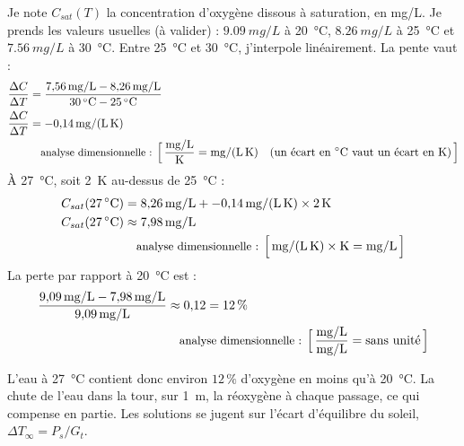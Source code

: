 \begin{demonstration}
Je note $C_{sat}(T)$ la concentration d'oxygène dissous à saturation, en mg/L. Je prends les valeurs usuelles (à valider) : $\qty{9,09}{mg/L}$ à \qty{20}{\celsius}, $\qty{8,26}{mg/L}$ à \qty{25}{\celsius} et $\qty{7,56}{mg/L}$ à \qty{30}{\celsius}. Entre \qty{25}{\celsius} et \qty{30}{\celsius}, j'interpole linéairement. La pente vaut :
\begin{align*}
\frac{\Delta C}{\Delta T} &= \frac{\qty{7,56}{mg/L} - \qty{8,26}{mg/L}}{\qty{30}{\celsius} - \qty{25}{\celsius}}\\
\frac{\Delta C}{\Delta T} &= \qty{-0,14}{mg/(L\,K)}\\
\dimline{\dfrac{\unit{mg/L}}{\unit{K}}=\unit{mg/(L\,K)}\quad(\text{un écart en \unit{\celsius} vaut un écart en \unit{K}})}
\end{align*}
À \qty{27}{\celsius}, soit \qty{2}{K} au-dessus de \qty{25}{\celsius} :
\begin{align*}
C_{sat}(\qty{27}{\celsius}) &= \qty{8,26}{mg/L} + \qty{-0,14}{mg/(L\,K)} \times \qty{2}{K}\\
C_{sat}(\qty{27}{\celsius}) &\approx \qty{7,98}{mg/L}\\
\dimline{\unit{mg/(L\,K)}\times\unit{K}=\unit{mg/L}}
\end{align*}
La perte par rapport à \qty{20}{\celsius} est :
\begin{align*}
\frac{\qty{9,09}{mg/L} - \qty{7,98}{mg/L}}{\qty{9,09}{mg/L}} &\approx 0{,}12 = 12\,\%\\
\dimline{\dfrac{\unit{mg/L}}{\unit{mg/L}}=\text{sans unité}}
\end{align*}
\end{demonstration}

L'eau à \qty{27}{\celsius} contient donc environ $12\,\%$ d'oxygène en moins qu'à \qty{20}{\celsius}. La chute de l'eau dans la tour, sur \qty{1}{m}, la réoxygène à chaque passage, ce qui compense en partie. Les solutions se jugent sur l'écart d'équilibre du soleil, $\Delta T_{\infty} = P_s/G_t$.

